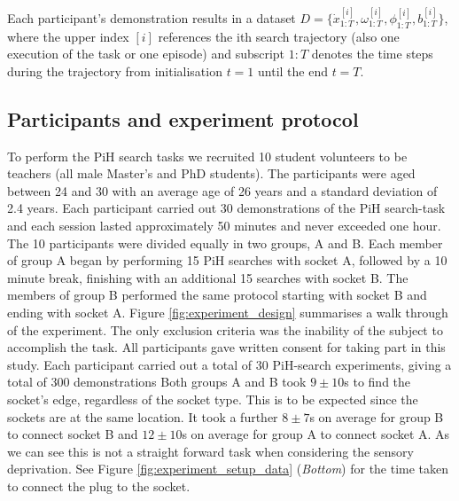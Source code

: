 \documentclass[final,3p,times,twocolumn]{elsarticle}
\begin{document}
Each participant's demonstration results in a dataset $D=\{\dot{x}^{[i]}_{1:T},\omega^{[i]}_{1:T},\phi^{[i]}_{1:T},b^{[i]}_{1:T}\}$, 
where the upper index $[i]$ references the ith search trajectory (also one execution of the task or one episode) and 
subscript $1:T$ denotes the time steps during the trajectory from initialisation $t=1$ until the end $t=T$. 

\subsection{Participants and experiment protocol}

To perform the PiH search tasks we recruited 10 student volunteers to be teachers (all male Master's and PhD students).
The participants were aged between 24 and 30 with an average age of 26 years and a standard deviation of 2.4 years.
Each participant carried out 30 demonstrations of the PiH search-task and each session lasted approximately 50 minutes and 
never exceeded one hour. The 10 participants were divided equally in two groups, A and B. Each member of group A began 
by performing 15 PiH searches with socket A, followed by a 10 minute break, finishing with an additional 15 searches with socket B. 
The members of group B performed the same protocol starting with socket B and ending with socket A.
Figure \ref{fig:experiment_design} summarises a walk through of the experiment.
The only exclusion criteria was the inability of the subject to accomplish the task. All participants gave written consent 
for taking part in this study. Each participant carried out a total of 30 PiH-search experiments, giving a 
total of 300 demonstrations
Both groups A and B took $9\pm10$s to find the socket's edge, regardless of the socket type. This is to be expected since the sockets 
are at the same location. It took a further $8\pm7$s on average for group B to connect
socket B and $12\pm10$s on average for group A to connect socket A. As we can see this is not a straight forward task when considering
the sensory deprivation. See Figure \ref{fig:experiment_setup_data} (\textit{Bottom}) for the time taken to connect the plug to the socket.

\end{document}

